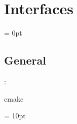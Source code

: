 
\section{Interfaces} 


\parskip = 0pt

\vspace{3mm} \subsection*{General}

: 

cmake
\vspace{2mm}

\vspace{5mm}\parskip = 10pt 
